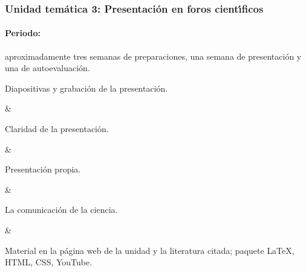 \subsubsection{Unidad tem\'{a}tica 3: Presentaci\'{o}n en foros
  cient\'{\i}ficos}

\paragraph{Periodo:} aproximadamente tres semanas de preparaciones,
una semana de presentaci\'{o}n y una de autoevaluaci\'{o}n.



Diapositivas y grabaci\'{o}n de la presentaci\'{o}n.

&

Claridad de la presentaci\'{o}n.

&

Presentaci\'{o}n propia.

&

La comunicaci\'{o}n de la ciencia.

&

Material en la p\'{a}gina web de la unidad y la literatura citada;
paquete {\LaTeX}, HTML, CSS, YouTube.



